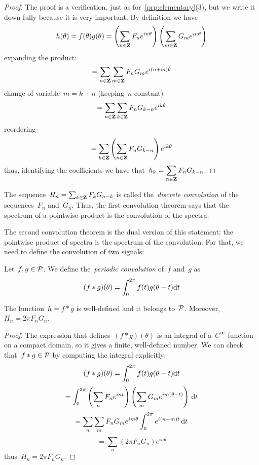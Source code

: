 \begin{proof}
	The proof is a verification, just as for~\ref{prp:elementary}(3), but
	we write it down fully because it is very important.  By definition we
	have
	\[
		h(\theta)=f(\theta)g(\theta)
		=
		\left(\sum_{n\in\mathbf{Z}}F_ne^{in\theta}\right)
		\left(\sum_{m\in\mathbf{Z}}G_me^{in\theta}\right)
	\]
	expanding the product:
	\[
		=
		\sum_{n\in\mathbf{Z}}\sum_{m\in\mathbf{Z}} F_n G_m e^{i(n+m)\theta}
	\]
	change of variable~$m=k-n$ (keeping~$n$ constant)
	\[
		=\sum_{n\in\mathbf{Z}}\sum_{k\in\mathbf{Z}} F_n G_{k-n} e^{ik\theta}
	\]
	reordering
	\[
		=\sum_{k\in\mathbf{Z}}\left(\sum_{n\in\mathbf{Z}} F_n G_{k-n}\right)e^{ik\theta}
	\]
	thus, identifying the coefficients we have
	that~$\displaystyle h_k=\sum_{n\in\mathbf{Z}} F_n G_{k-n}$.
\end{proof}

The sequence~$H_n=\sum_{k\in\mathbf{Z}} F_k G_{n-k}$ is called the~\emph{discrete
convolution} of the sequences~$F_n$ and~$G_n$.  Thus, the first convolution
theorem says that the spectrum of a pointwise product is the convolution of the
spectra.

The second convolution theorem is the dual version of this statement: the
pointwise product of spectra is the spectrum of the convolution.  For that, we
need to define the convolution of two signals:

\begin{definition}
	Let~$f,g\in\mathcal{P}$.  We define the~\emph{periodic convolution} of~$f$
	and~$g$ as
	\[
		(f*g)(\theta)=\int_0^{2\pi}f(t)g(\theta-t)\mathrm{d} t
	\]
\end{definition}

\begin{proposition}
	The function~$h=f*g$ is well-defined and it belongs to~$\mathcal{P}$.
	Moreover,~$H_n=2\pi F_n G_n$.
\end{proposition}

\begin{proof}
	The expression that defines~$(f*g)(\theta)$ is an integral of
	a~$C^\infty$ function on a compact domain, so it gives a finite,
	well-defined number.  We can check that~$f*g\in\mathcal{P}$ by computing the
	integral explicitly:
	$$ (f*g)(\theta)=\int_0^{2\pi}f(t)g(\theta-t)\mathrm{d} t $$
	$$ = \int_0^{2\pi}
	\left(\sum_nF_ne^{int}\right)
	\left(\sum_mG_me^{im(\theta-t)}\right)
	\,\mathrm{d} t
	$$
	$$ = \sum_n\sum_mF_nG_me^{im\theta}\int_0^{2\pi}e^{i(n-m)t}
	\,\mathrm{d} t
	$$
	$$ = \sum_n\left(2\pi F_nG_n\right)e^{in\theta}
	$$
	thus~$H_n=2\pi F_nG_n$.
\end{proof}

